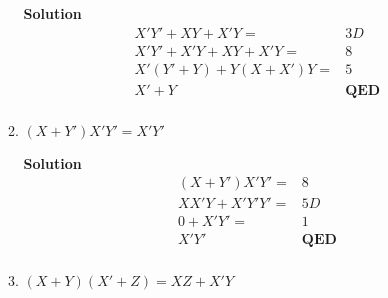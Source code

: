 \begin{enumerate}
\begin{enumerate}
                                \begin{onlysolution}  \textbf{Solution}
                                    \begin{align*}
                                        &X'Y' + XY + X'Y =          & 3D\\
                                        &X'Y' + X'Y + XY+ X'Y =     & 8 \\
                                        &X'(Y' + Y )+ Y(X+ X')Y=    & 5 \\
                                        &X' + Y                     & \textbf{{QED}} \\
                                    \end{align*}
                                \end{onlysolution}

                            \item $(X+Y')X'Y' = X'Y'$

                                \begin{onlysolution}  \textbf{Solution}
                                    \begin{align*}
                                        &(X+Y')X'Y' =     & 8 \\
                                        &XX'Y + X'Y'Y' =  & 5D \\
                                        &0+X'Y'=          & 1 \\
                                        &X'Y'             & \textbf{{QED}} \\
                                    \end{align*}
                                \end{onlysolution}

                            \item $(X+Y)(X'+Z) = XZ + X'Y$


\end{enumerate}
\end{enumerate}
